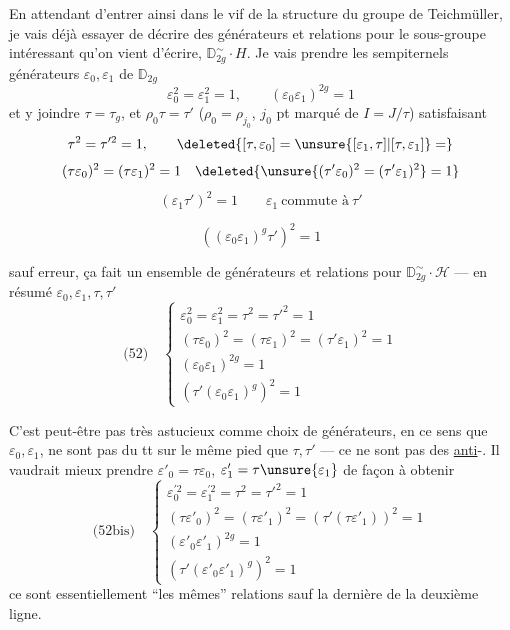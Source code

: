 
En attendant d'entrer ainsi dans le vif de la structure du groupe de Teichmüller, je vais déjà essayer de décrire des générateurs et relations pour le sous-groupe intéressant qu'on vient d'écrire, $\mathbb D_{2g}^{\sim}\cdot H$.
Je vais prendre les sempiternels générateurs $\varepsilon_0,\varepsilon_1$ de $\mathbb D_{2g}$
\[
\varepsilon_0^2=\varepsilon_1^2=1,\qquad (\varepsilon_0\varepsilon_1)^{2g}=1
\]
et y joindre $\tau=\tau_g$, et  $\rho_0\tau=\tau'$
($\rho_0=\rho_{j_0}$, $j_0$ pt marqué de $I=J/\tau$)
satisfaisant
\[
\tau^2=\tau'^2=1,\qquad
\deleted{[\tau,\varepsilon_0]=\unsure{[\varepsilon_1,\tau]|[\tau,\varepsilon_1]}=}
\]
\[
(\tau\varepsilon_0)^2=(\tau\varepsilon_1)^2=1\quad
\deleted{\unsure{(\tau'\varepsilon_0)^2=(\tau'\varepsilon_1)^2}=1}
\]
\[
(\varepsilon_1\tau')^2=1
\qquad \varepsilon_1\ \text{commute à}\ \tau'
\]





\[
((\varepsilon_0\varepsilon_1)^g\tau')^2=1
\]

sauf erreur, ça fait un ensemble de générateurs et relations pour $\mathbb D_{2g}^{\sim}\cdot\mathcal H$ --- en résumé $\varepsilon_0,\varepsilon_1,\tau,\tau'$
\[
\text{(52)}\quad
\left\{
\begin{array}{l}
\varepsilon_0^2=\varepsilon_1^2=\tau^2=\tau'^2=1\\
(\tau\varepsilon_0)^2=(\tau\varepsilon_1)^2=(\tau'\varepsilon_1)^2=1\\
(\varepsilon_0\varepsilon_1)^{2g}=1\\
(\tau'(\varepsilon_0\varepsilon_1)^g)^2=1
\end{array}
\right.
\]

C'est peut-être pas très astucieux comme choix de générateurs, en ce sens que $\varepsilon_0,\varepsilon_1$, ne sont pas du tt sur le même pied que $\tau,\tau'$ --- ce ne sont pas des \uline{anti}-. Il vaudrait mieux prendre $\varepsilon'_0=\tau\varepsilon_0$, $\varepsilon'_1=\tau\unsure{\varepsilon_1}$ de façon à obtenir
\[
\text{(52bis)}\quad
\left\{
\begin{array}{l}
\varepsilon_0^{\prime 2}=\varepsilon_1^{\prime 2}=\tau^2=\tau'^2=1\\
(\tau\varepsilon'_0)^2=(\tau\varepsilon'_1)^2=(\tau'(\tau\varepsilon'_1))^2=1\\
(\varepsilon'_0\varepsilon'_1)^{2g}=1\\
(\tau'(\varepsilon'_0\varepsilon'_1)^g)^2=1
\end{array}
\right.
\]
ce sont essentiellement ``les mêmes'' relations sauf la dernière de la deuxième ligne.

